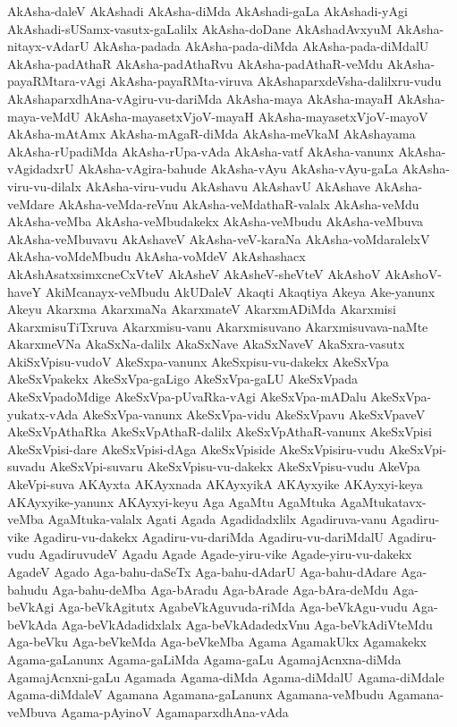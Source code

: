 {AkAsha-daleV
AkAshadi
AkAsha-diMda
AkAshadi-gaLa
AkAshadi-yAgi
AkAshadi-sUSamx-vasutx-gaLalilx
AkAsha-doDane
AkAshadAvxyuM
AkAsha-nitayx-vAdarU
AkAsha-padada
AkAsha-pada-diMda
AkAsha-pada-diMdalU
AkAsha-padAthaR
AkAsha-padAthaRvu
AkAsha-padAthaR-veMdu
AkAsha-payaRMtara-vAgi
AkAsha-payaRMta-viruva
AkAshaparxdeVsha-dalilxru-vudu
AkAshaparxdhAna-vAgiru-vu-dariMda
AkAsha-maya
AkAsha-mayaH
AkAsha-maya-veMdU
AkAsha-mayasetxVjoV-mayaH
AkAsha-mayasetxVjoV-mayoV
AkAsha-mAtAmx
AkAsha-mAgaR-diMda
AkAsha-meVkaM
AkAshayama
AkAsha-rUpadiMda
AkAsha-rUpa-vAda
AkAsha-vatf
AkAsha-vanunx
AkAsha-vAgidadxrU
AkAsha-vAgira-bahude
AkAsha-vAyu
AkAsha-vAyu-gaLa
AkAsha-viru-vu-dilalx
AkAsha-viru-vudu
AkAshavu
AkAshavU
AkAshave
AkAsha-veMdare
AkAsha-veMda-reVnu
AkAsha-veMdathaR-valalx
AkAsha-veMdu
AkAsha-veMba
AkAsha-veMbudakekx
AkAsha-veMbudu
AkAsha-veMbuva
AkAsha-veMbuvavu
AkAshaveV
AkAsha-veV-karaNa
AkAsha-voMdaralelxV
AkAsha-voMdeMbudu
AkAsha-voMdeV
AkAshashacx
AkAshAsatxsimxcneCxVteV
AkAsheV
AkAsheV-sheVteV
AkAshoV
AkAshoV-haveY
AkiMcanayx-veMbudu
AkUDaleV
Akaqti
Akaqtiya
Akeya
Ake-yanunx
Akeyu
Akarxma
AkarxmaNa
AkarxmateV
AkarxmADiMda
Akarxmisi
AkarxmisuTiTxruva
Akarxmisu-vanu
Akarxmisuvano
Akarxmisuvava-naMte
AkarxmeVNa
AkaSxNa-dalilx
AkaSxNave
AkaSxNaveV
AkaSxra-vasutx
AkiSxVpisu-vudoV
AkeSxpa-vanunx
AkeSxpisu-vu-dakekx
AkeSxVpa
AkeSxVpakekx
AkeSxVpa-gaLigo
AkeSxVpa-gaLU
AkeSxVpada
AkeSxVpadoMdige
AkeSxVpa-pUvaRka-vAgi
AkeSxVpa-mADalu
AkeSxVpa-yukatx-vAda
AkeSxVpa-vanunx
AkeSxVpa-vidu
AkeSxVpavu
AkeSxVpaveV
AkeSxVpAthaRka
AkeSxVpAthaR-dalilx
AkeSxVpAthaR-vanunx
AkeSxVpisi
AkeSxVpisi-dare
AkeSxVpisi-dAga
AkeSxVpiside
AkeSxVpisiru-vudu
AkeSxVpi-suvadu
AkeSxVpi-suvaru
AkeSxVpisu-vu-dakekx
AkeSxVpisu-vudu
AkeVpa
AkeVpi-suva
AKAyxta
AKAyxnada
AKAyxyikA
AKAyxyike
AKAyxyi-keya
AKAyxyike-yanunx
AKAyxyi-keyu
Aga
AgaMtu
AgaMtuka
AgaMtukatavx-veMba
AgaMtuka-valalx
Agati
Agada
Agadidadxlilx
Agadiruva-vanu
Agadiru-vike
Agadiru-vu-dakekx
Agadiru-vu-dariMda
Agadiru-vu-dariMdalU
Agadiru-vudu
AgadiruvudeV
Agadu
Agade
Agade-yiru-vike
Agade-yiru-vu-dakekx
AgadeV
Agado
Aga-bahu-daSeTx
Aga-bahu-dAdarU
Aga-bahu-dAdare
Aga-bahudu
Aga-bahu-deMba
Aga-bAradu
Aga-bArade
Aga-bAra-deMdu
Aga-beVkAgi
Aga-beVkAgitutx
AgabeVkAguvuda-riMda
Aga-beVkAgu-vudu
Aga-beVkAda
Aga-beVkAdadidxlalx
Aga-beVkAdadedxVnu
Aga-beVkAdiVteMdu
Aga-beVku
Aga-beVkeMda
Aga-beVkeMba
Agama
AgamakUkx
Agamakekx
Agama-gaLanunx
Agama-gaLiMda
Agama-gaLu
AgamajAcnxna-diMda
AgamajAcnxni-gaLu
Agamada
Agama-diMda
Agama-diMdalU
Agama-diMdale
Agama-diMdaleV
Agamana
Agamana-gaLanunx
Agamana-veMbudu
Agamana-veMbuva
Agama-pAyinoV
AgamaparxdhAna-vAda
}
